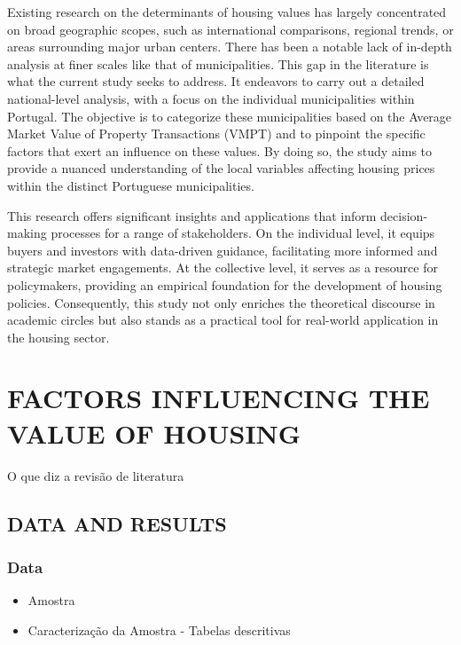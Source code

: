 \documentclass{aip-cp}
\begin{document}
Existing research on the determinants of housing values has largely concentrated on broad geographic scopes, such as international comparisons, regional trends, or areas surrounding major urban centers. There has been a notable lack of in-depth analysis at finer scales like that of municipalities. This gap in the literature is what the current study seeks to address. It endeavors to carry out a detailed national-level analysis, with a focus on the individual municipalities within Portugal. The objective is to categorize these municipalities based on the Average Market Value of Property Transactions (VMPT) and to pinpoint the specific factors that exert an influence on these values. By doing so, the study aims to provide a nuanced understanding of the local variables affecting housing prices within the distinct Portuguese municipalities.

This research offers significant insights and applications that inform decision-making processes for a range of stakeholders. On the individual level, it equips buyers and investors with data-driven guidance, facilitating more informed and strategic market engagements. At the collective level, it serves as a resource for policymakers, providing an empirical foundation for the development of housing policies. Consequently, this study not only enriches the theoretical discourse in academic circles but also stands as a practical tool for real-world application in the housing sector.



\section{\uppercase{Factors influencing the value of housing}}

O que diz a revisão de literatura 

\subsection{\uppercase{Data and Results}}
\subsubsection{Data}

\begin{itemize}
    \item Amostra
    \item Caracterização da Amostra - Tabelas descritivas 
\end{itemize}
\end{document}
